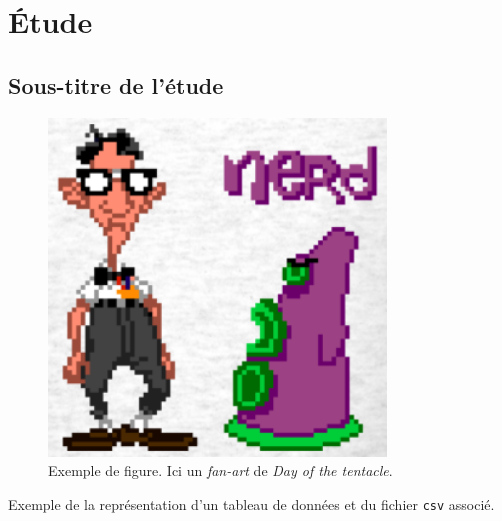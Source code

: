 
\section{Étude}

	\subsection{Sous-titre de l'étude}

	\begin{figure}[h]
		\centering
		\includegraphics[width=0.8\textwidth]{img/dott.png}
		\caption[Exemple de figure]{Exemple de figure. Ici un \emph{fan-art} de \emph{Day of the tentacle}.}
	\end{figure}
	
	\begin{table}[h]%
		\centering
		\hspace{1em}
		\caption[Représentation d'un tableau et du fichier \texttt{csv} associé]{Exemple de la représentation d'un tableau de données et du fichier \texttt{csv} associé.}%
	\end{table}
	
